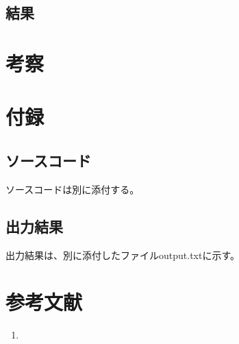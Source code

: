 \documentclass[11pt]{jsarticle}
\begin{document}
\subsection{結果}

\section{考察}

\section{付録}
\subsection{ソースコード}
ソースコードは別に添付する。

\subsection{出力結果}
出力結果は、別に添付したファイルoutput.txtに示す。

\section{参考文献}
\begin{enumerate}
\item
\end{enumerate}
\end{document}
